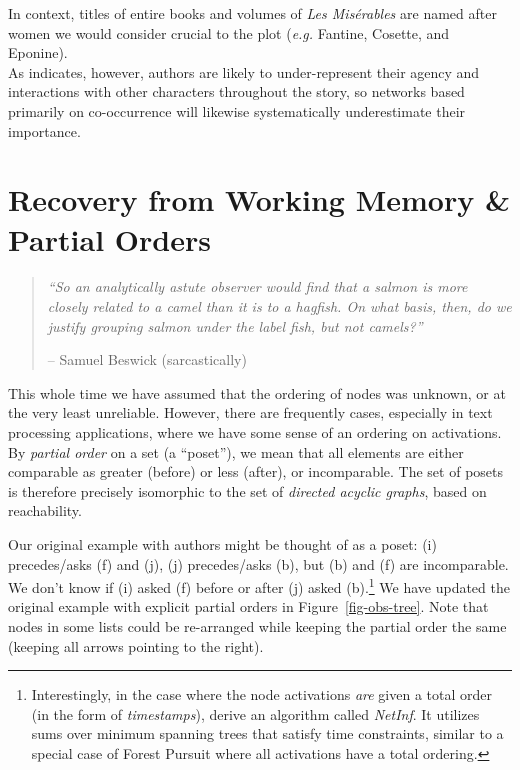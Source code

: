 \documentclass[%
	12pt,
		oneside,
		letterpaper
]{book}
\begin{document}
In context, titles of entire books and volumes of \emph{Les Misérables} are named after women we would consider crucial to the plot (\emph{e.g.} Fantine, Cosette, and Eponine).\\
As \textcite{genderagencygap_Stuhler2024} indicates, however, authors are likely to under-represent their agency and interactions with other characters throughout the story, so networks based primarily on co-occurrence will likewise systematically underestimate their importance.

\chapter{Recovery from Working Memory \& Partial Orders}\label{sec-ordered}

\begin{flushright}

\begin{minipage}{.7\linewidth}

\singlespacing

\begin{quote}
\emph{``So an analytically astute observer would find that a salmon is more closely related to a camel than it is to a hagfish. On what basis, then, do we justify grouping salmon under the label fish, but not camels?''}

\hfill -- Samuel Beswick (sarcastically)\\
\end{quote}

\doublespacing

\end{minipage}

\end{flushright}

This whole time we have assumed that the ordering of nodes was unknown, or at the very least unreliable.
However, there are frequently cases, especially in text processing applications, where we have some sense of an ordering on activations.
By \emph{partial order} on a set (a ``poset''), we mean that all elements are either comparable as greater (before) or less (after), or incomparable.
The set of posets is therefore precisely isomorphic to the set of \emph{directed acyclic graphs}, based on reachability.

Our original example with authors might be thought of as a poset: (i) precedes/asks (f) and (j), (j) precedes/asks (b), but (b) and (f) are incomparable.
We don't know if (i) asked (f) before or after (j) asked (b).\footnote{
  Interestingly, in the case where the node activations \emph{are} given a total order (in the form of \emph{timestamps}), \textcite{Inferringnetworksdiffusion_GomezRodriguez2012} derive an algorithm called \emph{NetInf}.
  It utilizes sums over minimum spanning trees that satisfy time constraints, similar to a special case of Forest Pursuit where all activations have a total ordering.}
We have updated the original example with explicit partial orders in Figure~\ref{fig-obs-tree}. Note that nodes in some lists could be re-arranged while keeping the partial order the same (keeping all arrows pointing to the right).
\end{document}
